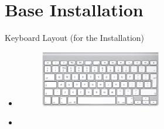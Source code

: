 
\section{Base Installation}

\begin{frame}[fragile]{Keyboard Layout (for the Installation)}
  \begin{itemize}
    \item {}
    \begin{figure}
      \includegraphics[width=0.5\textwidth]{./figures/keyboard.png}
    \end{figure}
    \item {}
  \end{itemize}
\end{frame}

